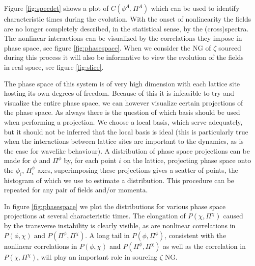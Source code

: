 Figure \ref{fig:specdet} shows a plot of $C(\phi^A,\Pi^A)$ which can be used to identify characteristic times during the evolution.
With the onset of nonlinearity the fields are no longer completely described, in the statistical sense, by the (cross)spectra.
The nonlinear interactions can be visualized by the correlations they impose in phase space, see figure \ref{fig:phasespace}.
When we consider the NG of $\zeta$ sourced during this process it will also be informative to view the evolution of the fields in real space, see figure \ref{fig:slice}.



The phase space of this system is of very high dimension with each lattice site hosting its own degrees of freedom.
Because of this it is infeasible to try and visualize the entire phase space, we can however visualize certain projections of the phase space.
As always there is the question of which basis should be used when performing a projection.
We choose a local basis, which serve adequately, but it should not be inferred that the local basis is ideal (this is particularly true when the interactions between lattice sites are important to the dynamics, as is the case for wavelike behaviour).
A distribution of phase space projections can be made for $\phi$ and $\Pi^\phi$ by, for each point $i$ on the lattice, projecting phase space onto the $\phi_i$, $\Pi^\phi_i$ axes, superimposing these projections gives a scatter of points, the histogram of which we use to estimate a distribution.
This procedure can be repeated for any pair of fields and/or momenta.

In figure \ref{fig:phasespace} we plot the distributions for various phase space projections at several characteristic times.
The elongation of $P(\chi,\Pi^\chi)$ caused by the transverse instability is clearly visible, as are nonlinear correlations in $P(\phi,\chi)$ and $P(\Pi^\phi,\Pi^\chi)$.
A long tail in $P(\phi,\Pi^\phi)$, consistent with the nonlinear correlations in $P(\phi,\chi)$ and $P(\Pi^\phi,\Pi^\chi)$ as well as the correlation in $P(\chi,\Pi^\chi)$, will play an important role in sourcing $\zeta$ NG.

